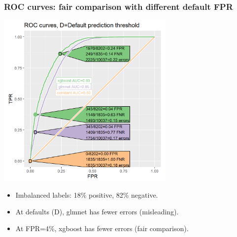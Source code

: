 \documentclass[t]{beamer}
\begin{document}
\begin{frame} \frametitle{ROC curves: fair comparison with different default FPR}
  \includegraphics[width=0.65\textwidth]{figure-batchtools-expired-earth-roc}
  \begin{itemize}
  \item Imbalanced labels: 18\% positive, 82\% negative.
  \item At defaults (D), glmnet has fewer errors (misleading).
  \item At FPR=4\%, xgboost has fewer errors (fair comparison).
  \end{itemize}
\end{frame}
\end{document}
